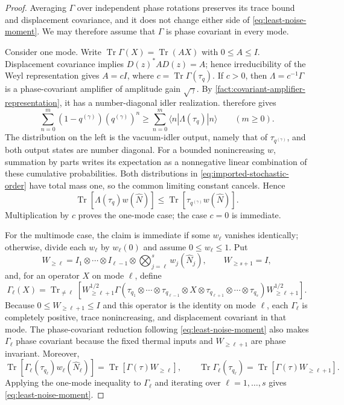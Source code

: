 \documentclass[11pt]{article}
\theoremstyle{remark}
\theoremstyle{plain}
\newcommand{\Tr}{\operatorname{Tr}}
\newcommand{\ot}{\otimes}
\begin{document}
\begin{proof}
Averaging \(\Gamma\) over independent phase rotations preserves its
trace bound and displacement covariance, and it does not change either side
of \eqref{eq:least-noise-moment}.  We may therefore assume that \(\Gamma\)
is phase covariant in every mode.

Consider one mode.  Write \(\Tr\Gamma(X)=\Tr(AX)\) with \(0\le A\le I\).
Displacement covariance implies \(D(z)^*AD(z)=A\); hence irreducibility of
the Weyl representation gives \(A=cI\), where
  \(c=\Tr\Gamma(\tau_q)\).  If \(c>0\), then
  \(\Lambda=c^{-1}\Gamma\) is a phase-covariant amplifier of amplitude gain
  \(\sqrt\gamma\).  By
  \cref{fact:covariant-amplifier-representation}, it has a number-diagonal
  idler realization.   therefore
  gives
\begin{equation}\label{eq:imported-stochastic-order}
  \sum_{n=0}^m(1-q^{(\gamma)})(q^{(\gamma)})^n
  \ge
  \sum_{n=0}^m\langle n|\Lambda(\tau_q)|n\rangle
  \qquad(m\ge0).
\end{equation}
The distribution on the left is the vacuum-idler output, namely that of
\(\tau_{q^{(\gamma)}}\), and both output states are number diagonal.  For a
bounded nonincreasing \(w\), summation by parts writes its expectation as a
nonnegative linear combination of these cumulative probabilities.  Both
distributions in \eqref{eq:imported-stochastic-order} have total mass one,
so the common limiting constant cancels.  Hence
\[
  \Tr[\Lambda(\tau_q)w(\widehat N)]
  \le\Tr[\tau_{q^{(\gamma)}}w(\widehat N)].
\]
Multiplication by \(c\) proves the one-mode case; the case \(c=0\) is
immediate.

For the multimode case, the claim is immediate if some \(w_\ell\)
vanishes identically; otherwise, divide each \(w_\ell\) by
\(w_\ell(0)\) and assume \(0\le w_\ell\le1\).  Put
\[
  W_{\ge\ell}
  =I_1\ot\cdots\ot I_{\ell-1}\ot
   \bigotimes_{j=\ell}^s w_j(\widehat N_j),
  \qquad W_{\ge s+1}=I,
\]
and, for an operator \(X\) on mode \(\ell\), define
\[
  \Gamma_\ell(X)
  =\Tr_{\ne\ell}\!\left[
    W_{\ge\ell+1}^{1/2}
    \Gamma(\tau_{q_1}\ot\cdots\ot\tau_{q_{\ell-1}}\ot X\ot
           \tau_{q_{\ell+1}}\ot\cdots\ot\tau_{q_s})
    W_{\ge\ell+1}^{1/2}
  \right].
\]
Because \(0\le W_{\ge\ell+1}\le I\) and this operator is the identity on
mode \(\ell\), each \(\Gamma_\ell\) is completely positive, trace
nonincreasing, and displacement covariant in that mode.  The phase-covariant
reduction following \eqref{eq:least-noise-moment} also makes \(\Gamma_\ell\)
phase covariant because the fixed thermal inputs and \(W_{\ge\ell+1}\) are
phase invariant.  Moreover,
\[
  \Tr[\Gamma_\ell(\tau_{q_\ell})w_\ell(\widehat N_\ell)]
  =\Tr[\Gamma(\tau)W_{\ge\ell}],
  \qquad
  \Tr\Gamma_\ell(\tau_{q_\ell})
  =\Tr[\Gamma(\tau)W_{\ge\ell+1}].
\]
Applying the one-mode inequality to \(\Gamma_\ell\) and iterating over
\(\ell=1,\ldots,s\) gives \eqref{eq:least-noise-moment}.
\end{proof}
\end{document}
